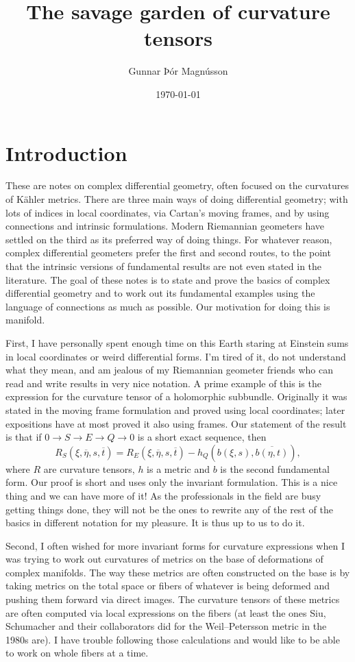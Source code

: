 \documentclass[10pt,a4paper]{article}
\author{Gunnar Þór Magnússon}
\date{\today}
\title{The savage garden of curvature tensors}
\begin{document}
\maketitle



\section*{Introduction}
\label{sec:introduction}

These are notes on complex differential geometry, often focused on the curvatures of K\"ahler metrics. There are three main ways of doing differential geometry; with lots of indices in local coordinates, via Cartan's moving frames, and by using connections and intrinsic formulations. Modern Riemannian geometers have settled on the third as its preferred way of doing things. For whatever reason, complex differential geometers prefer the first and second routes, to the point that the intrinsic versions of fundamental results are not even stated in the literature. The goal of these notes is to state and prove the basics of complex differential geometry and to work out its fundamental examples using the language of connections as much as possible. Our motivation for doing this is manifold.

First, I have personally spent enough time on this Earth staring at Einstein sums in local coordinates or weird differential forms. I'm tired of it, do not understand what they mean, and am jealous of my Riemannian geometer friends who can read and write results in very nice notation. A prime example of this is the expression for the curvature tensor of a holomorphic subbundle. Originally it was stated in the moving frame formulation and proved using local coordinates; later expositions have at most proved it also using frames. Our statement of the result is that if $0 \to S \to E \to Q \to 0$ is a short exact sequence, then
\[
R_S(\xi,\overline\eta,s,\overline t)
= R_E(\xi,\overline\eta,s,\overline t)
- h_Q(b(\xi,s),\overline{b(\eta,t)}),
\]
where $R$ are curvature tensors, $h$ is a metric and $b$ is the second fundamental form. Our proof is short and uses only the invariant formulation. This is a nice thing and we can have more of it!
As the professionals in the field are busy getting things done, they will not be the ones to rewrite any of the rest of the basics in different notation for my pleasure. It is thus up to us to do it.

Second, I often wished for more invariant forms for curvature expressions when I was trying to work out curvatures of metrics on the base of deformations of complex manifolds. The way these metrics are often constructed on the base is by taking metrics on the total space or fibers of whatever is being deformed and pushing them forward via direct images. The curvature tensors of these metrics are often computed via local expressions on the fibers (at least the ones Siu, Schumacher and their collaborators did for the Weil--Petersson metric in the 1980s are). I have trouble following those calculations and would like to be able to work on whole fibers at a time.
\end{document}
